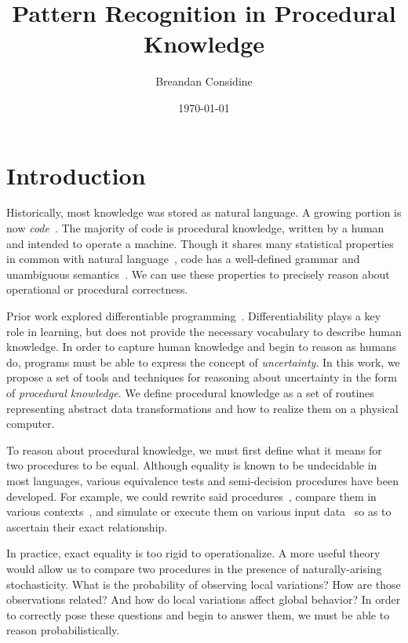 \documentclass[11pt]{article}
\title{Pattern Recognition in Procedural Knowledge}
\author{Breandan Considine}
\date{\today}
\begin{document}
    \maketitle

    \tableofcontents
    \pagebreak


    \section{Introduction}

    Historically, most knowledge was stored as natural language. A growing portion is now \textit{code}~\citep{allamanis2018survey}. The majority of code is procedural knowledge, written by a human and intended to operate a machine. Though it shares many statistical properties in common with natural language~\citep{hindle2012naturalness}, code has a well-defined grammar and unambiguous semantics~\citep{pierce2010software}. We can use these properties to precisely reason about operational or procedural correctness.

    Prior work explored differentiable programming~\citep{considine2019programming}. Differentiability plays a key role in learning, but does not provide the necessary vocabulary to describe human knowledge. In order to capture human knowledge and begin to reason as humans do, programs must be able to express the concept of \textit{uncertainty}. In this work, we propose a set of tools and techniques for reasoning about uncertainty in the form of \textit{procedural knowledge}. We define procedural knowledge as a set of routines representing abstract data transformations and how to realize them on a physical computer.

    To reason about procedural knowledge, we must first define what it means for two procedures to be equal. Although equality is known to be undecidable in most languages, various equivalence tests and semi-decision procedures have been developed. For example, we could rewrite said procedures~\citep{baader1999term}, compare them in various contexts~\citep{felleisen1990expressive}, and simulate or execute them on various input data~\citep{chen2020metamorphic} so as to ascertain their exact relationship.

    In practice, exact equality is too rigid to operationalize. A more useful theory would allow us to compare two procedures in the presence of naturally-arising stochasticity. What is the probability of observing local variations? How are those observations related? And how do local variations affect global behavior? In order to correctly pose these questions and begin to answer them, we must be able to reason probabilistically.
\end{document}
